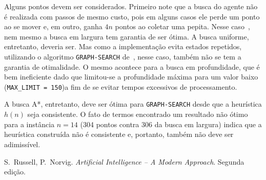 \documentclass[12pt,a4paper]{article}
\begin{document}
Alguns pontos devem ser considerados. Primeiro note que a busca do agente não é realizada com passos
de mesmo custo, pois em alguns casos ele perde um ponto ao se mover e, em outro, ganha $4n$ pontos
ao coletar uma pepita. Nesse caso~\cite{aima}, nem mesmo a busca em largura tem garantia de ser 
ótima. A busca uniforme, entretanto, deveria ser. Mas como a implementação evita estados repetidos, 
utilizando o algoritmo \verb|GRAPH-SEARCH| de~\cite{aima}, nesse caso, também não se tem a garantia 
de otimalidade. O mesmo acontece para a busca em profundidade, que é bem ineficiente dado que 
limitou-se a profundidade máxima para um valor baixo (\verb|MAX_LIMIT = 150|)a fim de se evitar 
tempos excessivos de processamento.

A busca A*, entretanto, deve ser ótima para \verb|GRAPH-SEARCH| desde que a heurística $h(n)$ seja
consistente. O fato de termos encontrado um resultado não ótimo para a instância $n = 14$ (304 
pontos contra 306 da busca em largura) indica que a heurística construída não é consistente e, 
portanto, também não deve ser adimissível.


\begin{thebibliography}{99}
   S.~Russell, P.~Norvig. {\it Artificial Intelligence -- A Modern Approach}. Segunda
  edição.
\end{thebibliography}
\end{document}
